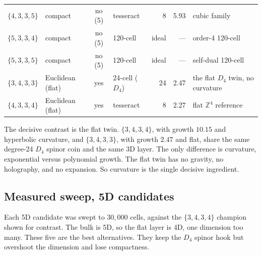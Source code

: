 {\begin{longtable}{l p{0.85in} c l r r p{1.7in}}
$\{4,3,3,5\}$ & compact & no (5) & tesseract & 8 & 5.93 & cubic family \\
$\{5,3,3,4\}$ & compact & no (5) & 120-cell & ideal & --- & order-4 120-cell \\
$\{5,3,3,5\}$ & compact & no (5) & 120-cell & ideal & --- & self-dual 120-cell \\
$\{3,4,3,3\}$ & Euclidean (flat) & yes & 24-cell ($D_4$) & 24 & 2.47 & the flat $D_4$ twin, no curvature \\
$\{4,3,3,4\}$ & Euclidean (flat) & yes & tesseract & 8 & 2.27 & flat $\mathbb{Z}^4$ reference \\
\end{longtable}}

The decisive contrast is the flat twin. $\{3,4,3,4\}$, with growth $10.15$ and hyperbolic curvature, and
$\{3,4,3,3\}$, with growth $2.47$ and flat, share the same degree-24 $D_4$ spinor coin and the same 3D layer. The
only difference is curvature, exponential versus polynomial growth. The flat twin has no gravity, no holography,
and no expansion. So curvature is the single decisive ingredient.

\subsection{Measured sweep, 5D candidates}

Each 5D candidate was swept to $30{,}000$ cells, against the $\{3,4,3,4\}$ champion shown for contrast. The bulk
is 5D, so the flat layer is 4D, one dimension too many. These five are the best alternatives. They keep the $D_4$
spinor hook but overshoot the dimension and lose compactness.

